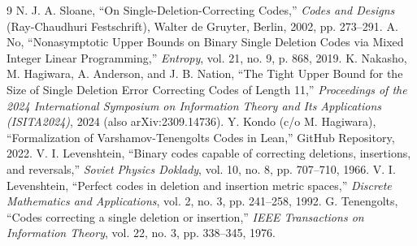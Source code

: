 \documentclass[11pt,a4paper]{article}
\theoremstyle{definition}
\begin{document}
\begin{thebibliography}{9}
N. J. A. Sloane, ``On Single-Deletion-Correcting Codes,'' \emph{Codes and Designs} (Ray-Chaudhuri Festschrift), Walter de Gruyter, Berlin, 2002, pp. 273--291.
A. No, ``Nonasymptotic Upper Bounds on Binary Single Deletion Codes via Mixed Integer Linear Programming,'' \emph{Entropy}, vol. 21, no. 9, p. 868, 2019.
K. Nakasho, M. Hagiwara, A. Anderson, and J. B. Nation, ``The Tight Upper Bound for the Size of Single Deletion Error Correcting Codes of Length 11,'' \emph{Proceedings of the 2024 International Symposium on Information Theory and Its Applications (ISITA2024)}, 2024 (also arXiv:2309.14736).
Y. Kondo (c/o M. Hagiwara), ``Formalization of Varshamov-Tenengolts Codes in Lean,'' GitHub Repository, 2022.
V. I. Levenshtein, ``Binary codes capable of correcting deletions, insertions, and reversals,'' \emph{Soviet Physics Doklady}, vol. 10, no. 8, pp. 707--710, 1966.
V. I. Levenshtein, ``Perfect codes in deletion and insertion metric spaces,'' \emph{Discrete Mathematics and Applications}, vol. 2, no. 3, pp. 241--258, 1992.
G. Tenengolts, ``Codes correcting a single deletion or insertion,'' \emph{IEEE Transactions on Information Theory}, vol. 22, no. 3, pp. 338--345, 1976.
\end{thebibliography}
\end{document}
